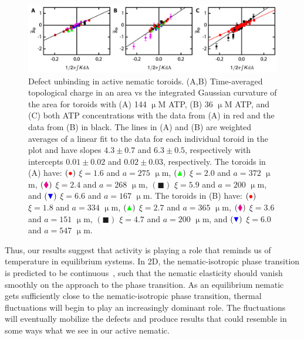 \begin{figure}
  \centering
  \includegraphics{figures/C3/Ch3-Figs_DefectUnbinding.png}
  \caption{Defect unbinding in active nematic toroids.
  (A,B) Time-averaged topological charge in an area vs the integrated Gaussian curvature of the area for toroids with (A) 144 $\upmu$M ATP, (B) 36 $\upmu$M ATP, and (C) both ATP concentrations with the data from (A) in red and the data from (B) in black.
  The lines in (A) and (B) are weighted averages of a linear fit to the data for each individual toroid in the plot and have slopes $4.3 \pm 0.7$ and $6.3 \pm 0.5$, respectively with intercepts $0.01 \pm 0.02$ and $0.02 \pm 0.03$, respectively.
  The toroids in (A) have:
  $({\color{red} \bullet})$ $\xi = 1.6 $ and $a = 275$ $\upmu$m,
  $({\color{green} \blacktriangle})$ $\xi = 2.0 $ and $a = 372$ $\upmu$m,
  $({\color{magenta} \blacklozenge})$ $\xi = 2.4 $ and $a = 268$ $\upmu$m,
  $({\blacksquare})$ $\xi = 5.9$ and $a = 200$ $\upmu$m, and
  $({\color{blue} \blacktriangledown})$ $\xi = 6.6$ and $a = 167$ $\upmu$m.
  The toroids in (B) have:
  $({\color{red} \bullet})$ $\xi = 1.8 $ and $a = 334$ $\upmu$m,
  $({\color{green} \blacktriangle})$ $\xi = 2.7 $ and $a = 365$ $\upmu$m,
  $({\color{magenta} \blacklozenge})$ $\xi = 3.6 $ and $a = 151$ $\upmu$m,
  $({\blacksquare})$ $\xi = 4.7$ and $a = 200$ $\upmu$m, and
  $({\color{blue} \blacktriangledown})$ $\xi = 6.0$ and $a = 547$ $\upmu$m.}\label{f:3-DefectUnbinding}
\end{figure}

Thus, our results suggest that activity is playing a role that reminds us of temperature in equilibrium systems.
In 2D, the  nematic-isotropic phase transition is predicted to be continuous~\cite{RN172}, such that the nematic elasticity should vanish smoothly on the approach to the phase transition.
As an equilibrium nematic gets sufficiently close to the nematic-isotropic phase transition, thermal fluctuations will begin to play an increasingly dominant role.
The fluctuations will eventually mobilize the defects and produce results that could resemble in some ways what we see in our active nematic.




